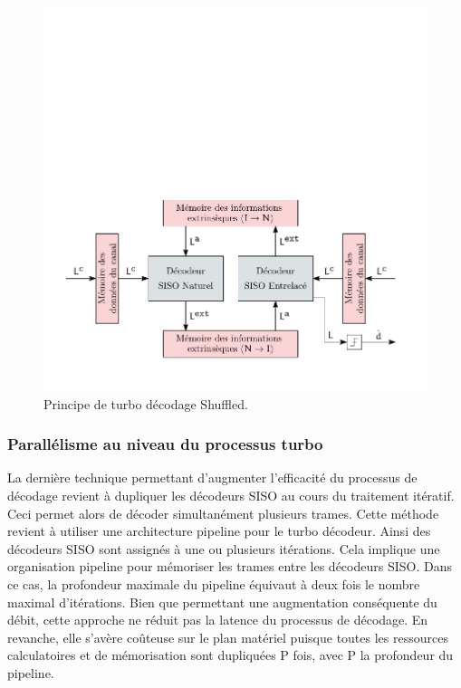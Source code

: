 \begin{figure}[!h]
	\centering
	\includegraphics{main/ch4_fig/ipe/shuffled_2.pdf}
	\caption{Principe de turbo décodage Shuffled. \label{fig:turbo_shuff}}
\end{figure}

\subsubsection{Parallélisme au niveau du processus turbo}
La dernière technique permettant d'augmenter l'efficacité du processus de décodage revient à dupliquer les décodeurs 
SISO au cours du traitement itératif. Ceci permet alors de décoder simultanément plusieurs trames. Cette méthode revient 
à utiliser une architecture pipeline pour le turbo décodeur. Ainsi des décodeurs SISO sont assignés à une ou plusieurs 
itérations. Cela implique une organisation pipeline pour mémoriser les trames entre les décodeurs SISO. Dans ce cas, la 
profondeur maximale du pipeline équivaut à deux fois le nombre maximal d'itérations. Bien que permettant une augmentation 
conséquente du débit, cette approche ne réduit pas la latence du processus de décodage. En revanche, elle s'avère 
coûteuse sur le plan matériel puisque toutes les ressources calculatoires et de mémorisation sont dupliquées P fois, 
avec P la profondeur du pipeline.

